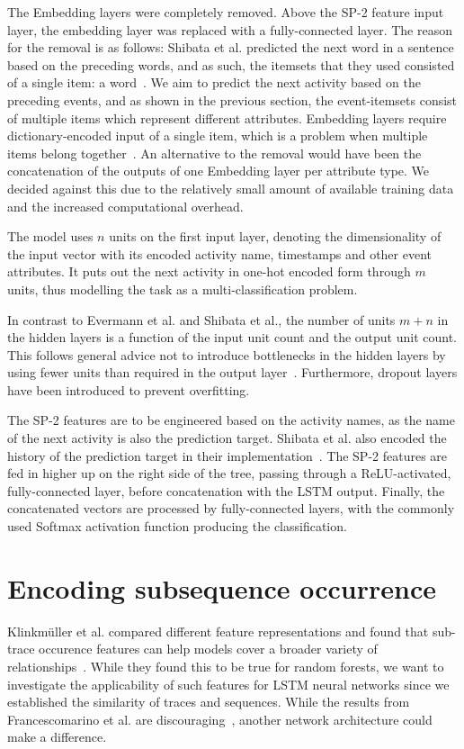 The Embedding layers were completely removed. Above the SP-2 feature input layer, the embedding layer was replaced with a fully-connected layer. The reason for the removal is as follows: Shibata et al. predicted the next word in a sentence based on the preceding words, and as such, the itemsets that they used consisted of a single item: a word~\cite{shibata2016bipartite}. We aim to predict the next activity based on the preceding events, and as shown in the previous section, the event-itemsets consist of multiple items which represent different attributes.
Embedding layers require dictionary-encoded input of a single item, which is a problem when multiple items belong together~\cite{goldberg2014word2vec}. An alternative to the removal would have been the concatenation of the outputs of one Embedding layer per attribute type. We decided against this due to the relatively small amount of available training data and the increased computational overhead.

The model uses $n$ units on the first input layer, denoting the dimensionality of the input vector with its encoded activity name, timestamps and other event attributes. It puts out the next activity in one-hot encoded form through $m$ units, thus modelling the task as a multi-classification problem.

In contrast to Evermann et al. and Shibata et al., the number of units $m+n$ in the hidden layers is a function of the input unit count and the output unit count. This follows general advice not to introduce bottlenecks in the hidden layers by using fewer units than required in the output layer~\cite{web:techniques-in-convnets,szegedy2016rethinking}. Furthermore, dropout layers have been introduced to prevent overfitting.

The SP-2 features are to be engineered based on the activity names, as the name of the next activity is also the prediction target. Shibata et al. also encoded the history of the prediction target in their implementation~\cite{shibata2016bipartite}. The SP-2 features are fed in higher up on the right side of the tree, passing through a ReLU-activated, fully-connected layer, before concatenation with the LSTM output. Finally, the concatenated vectors are processed by fully-connected layers, with the commonly used Softmax activation function producing the classification.

\section{Encoding subsequence occurrence}
\label{sec:contrib:pfs-inspiration}
Klinkmüller et al. compared different feature representations and found that sub-trace occurence features can help models cover a broader variety of relationships~\cite{klinkmuller2018reliablemonitoring}. While they found this to be true for random forests, we want to investigate the applicability of such features for LSTM neural networks since we established the similarity of traces and sequences. While the results from Francescomarino et al. are discouraging~\cite{francescomarino2017}, another network architecture could make a difference.

